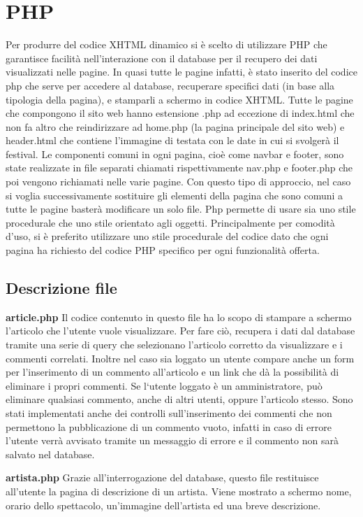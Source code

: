 \documentclass[10pt, a4paper]{article}
\begin{document}
\section{PHP}
Per produrre del codice XHTML dinamico si è scelto di utilizzare PHP che garantisce facilità nell’interazione con il database per il recupero dei dati visualizzati nelle pagine.
In quasi tutte le pagine infatti, è stato inserito del codice php che serve per accedere al database, recuperare specifici dati (in base alla tipologia della pagina), e stamparli a schermo  in codice XHTML.
Tutte le pagine che compongono il sito web hanno estensione .php ad eccezione di index.html che non fa altro che reindirizzare ad home.php (la pagina principale del sito web) e header.html che contiene l’immagine di testata con le date in cui si svolgerà il festival.
Le componenti comuni in ogni pagina, cioè come navbar e footer, sono state realizzate in file separati chiamati rispettivamente nav.php e footer.php che poi vengono richiamati nelle varie pagine.
Con questo tipo di approccio, nel caso si voglia successivamente sostituire gli elementi della pagina che sono comuni a tutte le pagine basterà modificare un solo file.
Php permette di usare sia uno stile procedurale che uno stile orientato agli oggetti. Principalmente per comodità d’uso, si è preferito utilizzare uno stile procedurale del codice dato che ogni pagina ha richiesto del codice PHP specifico per ogni funzionalità offerta.

\subsection{Descrizione file}
\textbf{article.php}
Il codice contenuto in questo file ha lo scopo di stampare a schermo l’articolo che l’utente vuole visualizzare. Per fare ciò, recupera i dati dal database tramite una serie di query che selezionano l’articolo corretto da visualizzare e i commenti correlati.
Inoltre nel caso sia loggato un utente compare anche un form per l’inserimento di un commento all’articolo e un link che dà la possibilità di eliminare i propri commenti.
Se l‘utente loggato è un amministratore, può eliminare qualsiasi commento, anche di altri utenti, oppure l’articolo stesso. 
Sono stati implementati anche dei controlli sull’inserimento dei commenti che non permettono la pubblicazione di un commento vuoto, infatti in caso di errore l’utente verrà avvisato tramite un messaggio di errore e il commento non sarà salvato nel database.


\textbf{artista.php}
Grazie all’interrogazione del database, questo file restituisce all’utente la pagina di descrizione di un artista.
Viene mostrato a schermo nome, orario dello spettacolo, un’immagine dell’artista ed una breve descrizione. 
\end{document}
